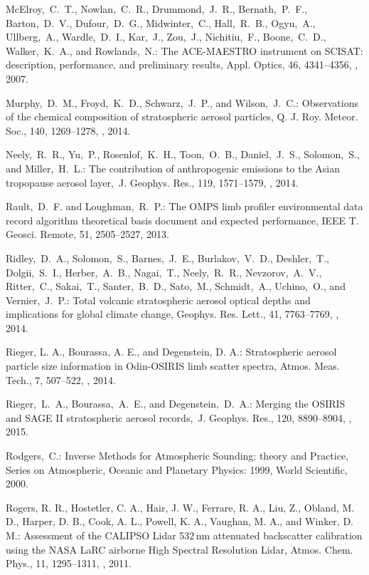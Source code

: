 \documentclass[amt]{copernicus}
\begin{document}
\begin{thebibliography}{99}
McElroy,~C.~T., Nowlan,~C.~R., Drummond,~J.~R., Bernath,~P.~F.,
Barton,~D.~V., Dufour,~D.~G., Midwinter,~C., Hall,~R.~B., Ogyu,~A.,
Ullberg,~A., Wardle,~D.~I., Kar,~J., Zou,~J., Nichitiu,~F., Boone,~C.~D.,
Walker,~K.~A., and Rowlands,~N.: The ACE-MAESTRO instrument on SCISAT:
description, performance, and preliminary results, Appl. Optics, 46,
4341--4356,
,
2007.


Murphy,~D.~M., Froyd,~K.~D., Schwarz,~J.~P., and Wilson,~J.~C.: Observations
of the chemical composition of stratospheric aerosol particles, Q. J. Roy.
Meteor. Soc., 140, 1269--1278,
, 2014.


Neely,~R.~R., Yu,~P., Rosenlof,~K.~H., Toon,~O.~B., Daniel,~J.~S.,
Solomon,~S., and Miller,~H.~L.: The contribution of anthropogenic 
emissions to the Asian tropopause aerosol layer,~J. Geophys. Res., 119,
1571--1579,
,
2014.


Rault,~D.~F. and Loughman,~R.~P.: The OMPS limb profiler environmental data
record algorithm theoretical basis document and expected performance, IEEE T.
Geosci. Remote, 51, 2505--2527, 2013.


Ridley,~D.~A., Solomon,~S., Barnes,~J.~E., Burlakov,~V.~D., Deshler,~T.,
Dolgii,~S.~I., Herber,~A.~B., Nagai,~T., Neely,~R.~R., Nevzorov,~A.~V.,
Ritter,~C., Sakai,~T., Santer,~B.~D., Sato,~M., Schmidt,~A., Uchino,~O., and
Vernier,~J.~P.: Total volcanic stratospheric aerosol optical depths and
implications for global climate change, Geophys. Res. Lett., 41, 7763--7769,
,
2014.


Rieger, L. A., Bourassa, A. E., and Degenstein, D. A.: Stratospheric aerosol
particle size information in Odin-OSIRIS limb scatter spectra, Atmos. Meas.
Tech., 7, 507--522, , 2014.



Rieger,~L.~A., Bourassa,~A.~E., and Degenstein,~D.~A.: Merging the OSIRIS and
SAGE II stratospheric aerosol records,~J. Geophys. Res., 120, 8890--8904,
,
2015.


Rodgers,~C.: Inverse Methods for Atmospheric Sounding: theory and Practice,
Series on Atmospheric, Oceanic and Planetary Physics: 1999, World
Scientific,
2000.


Rogers, R. R., Hostetler, C. A., Hair, J. W., Ferrare, R. A., Liu, Z.,
Obland, M. D., Harper, D. B., Cook, A. L., Powell, K. A., Vaughan, M. A., and
Winker, D. M.: Assessment of the CALIPSO Lidar 532\,nm attenuated backscatter
calibration using the NASA LaRC airborne High Spectral Resolution Lidar,
Atmos. Chem. Phys., 11, 1295--1311, , 2011.




\end{thebibliography}
\end{document}
